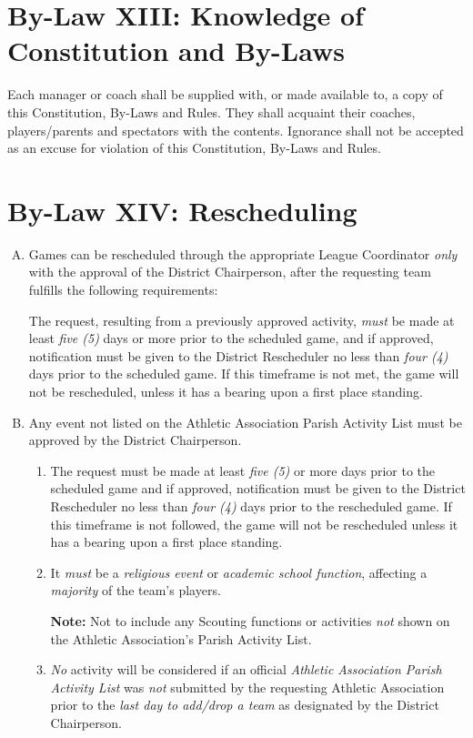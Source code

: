 \section{By-Law XIII: Knowledge of Constitution and By-Laws}
\label{sec:bylaw-13}
Each manager or coach shall be supplied with, or made available to, a copy of this Constitution, By-Laws and Rules. They shall acquaint their coaches, players/parents and spectators with the contents.  Ignorance shall not be accepted as an excuse for violation of this Con­stitution, By-Laws and Rules.

\section{By-Law XIV: Rescheduling}
\label{sec:bylaw-14}
\begin{enumerate}[A.]
    \item Games can be rescheduled through the appropriate League Coordinator {\em only} with the approval of the District Chairperson, after the requesting team fulfills the following requirements:
    
    The request, resulting from a previously approved activity, {\em must} be made at least {\em five (5)} days or more prior to the scheduled game, and if approved, notification must be given to the District Rescheduler no less than {\em four (4)} days prior to the scheduled game.  If this timeframe is not met, the game will not be rescheduled, unless it has a bearing upon a first place standing.

    \item Any event not listed on the Athletic Association Parish Activity List must be approved by the District Chairperson.
    
    \begin{enumerate}[1.]
        \item The request must be made at least {\em five (5)} or more days prior to the scheduled game and if approved, notification must be given to the District Rescheduler no less than {\em four (4)} days prior to the rescheduled game. If this timeframe is not followed, the game will not be rescheduled unless it has a bearing upon a first place standing.
        \item It {\em must} be a {\em religious event} or {\em academic school function}, affecting a {\em majority} of the team’s players.
        
        \textbf{Note:}  Not to include any Scouting functions or activities {\em not} shown on the Athletic Association’s Parish Activity List.
        \item {\em No} activity will be considered if an official {\em Athletic Association Parish Activity List} was {\em not} submitted by the requesting Athletic Association prior to the {\em last day to add/drop a team} as designated by the District Chairperson.
    \end{enumerate}


\end{enumerate}

